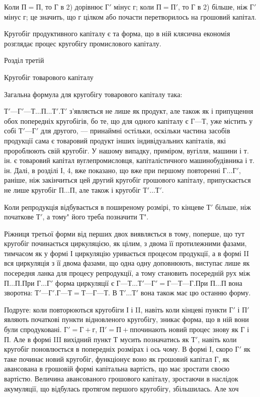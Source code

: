 Коли $П = П$, то Г в 2) дорівнює $Г'$ мінус г; коли $П = П'$, то Г в 2)
більше, ніж $Г'$ мінус г; це значить, що г цілком або почасти перетворилось
на грошовий капітал.

Кругобіг продуктивного капіталу є та форма, що в ній клясична
економія розглядає процес кругобігу промислового капіталу.

Розділ третій

Кругобіг товарового капіталу

Загальна формула для кругобігу товарового капіталу така:

$Т' — Г' — Т\dots{} П\dots{} Т'.

Т'$ з’являється не лише як продукт, але також як і припущення обох
попередніх кругобігів, бо те, що для одного капіталу є $Г — Т$, уже містить
у собі $Т' — Г'$ для другого, — принаймні остільки, оскільки частина засобів
продукції сама є товаровий продукт інших індивідуальних капіталів,
які пророблюють свій кругобіг. У нашому випадку, приміром,
вугілля, машини і т. ін. є товаровий капітал вуглепромисловця, капіталістичного
машинобудівника і т. ін. Далі, в розділі І, 4, вже показано,
що вже при першому повторенні $Г\dots{} Г'$, раніше, ніж закінчиться цей
другий кругобіг грошового капіталу, припускається не лише кругобіг
$П\dots{} П$, але також і кругобіг $Т'\dots{} Т'$.

Коли репродукція відбувається в поширеному розмірі, то кінцеве $Т'$
більше, ніж початкове $Т'$, а тому" його треба позначити Т".

Ріжниця третьої форми від перших двох виявляється в тому, поперше,
що тут кругобіг починається циркуляцією, як цілим, з двома її протилежними
фазами, тимчасом як у формі І циркуляцію уривається процесом
продукції, а в формі II вся циркуляція з її двома фазами, що одна одну
доповнюють, виступає лише як посередня ланка для процесу репродукції,
а тому становить посередній рух між $П\dots{} П. П$ри $Г\dots{} Г'$ форма
циркуляції є $Г — Т\dots{} Т' — Г' = Г — Т — Г. П$ри $П\dots{} П$ вона зворотна:
$Т' — Г'. Г — Т = Т — Г — Т$. В $Т'\dots{} Т'$ вона також має цю останню
форму.

Подруге: коли повторюються кругобіги І і II, навіть коли кінцеві
пункти $Г'$ і $П'$ являють початкові пункти відновленого кругобігу, зникає
форма, що в ній вони були спродуковані. $Г' = Г + г$, $П' = П + п п$очинають
новий процес знову як Г і П. Але в формі III вихідний пункт Т
мусить позначатись як $Т'$, навіть коли кругобіг поновлюється в попередніх
розмірах і ось чому. В формі І, скоро $Г'$ як таке починає новий
кругобіг, функціонує воно як грошовий капітал Г, як авансована в грошовій
формі капітальна вартість, що має зростати своєю вартістю.
Величина авансованого грошового капіталу, зростаючи в наслідок акумуляції,
що відбулась протягом першого кругобігу, збільшилась. Але хоч
\parbreak{}  %
